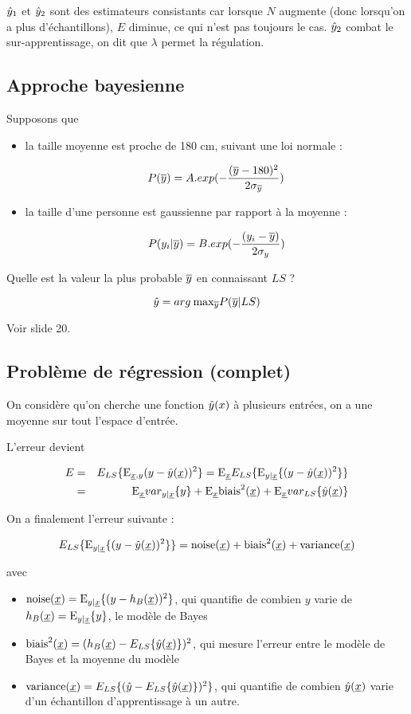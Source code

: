 	$\hat{y}_1$ et $\hat{y}_2$ sont des estimateurs consistants car lorsque $N$ augmente (donc lorsqu'on a plus d'échantillons), $E$ diminue, ce qui n'est pas toujours le cas. $\hat{y}_2$ combat le sur-apprentissage, on dit que $\lambda$ permet la régulation.
	
	
		\subsection{Approche bayesienne}
		
		Supposons que
		
		\begin{itemize}
			\item la taille moyenne est proche de 180 cm, suivant une loi normale :
			
			$$P(\overline{y}) = A.exp(- \frac{(\overline{y} - 180)^2}{2 \sigma_{\overline{y}}})$$
			
			\item la taille d'une personne est gaussienne par rapport à la moyenne :
			
			$$P(y_i \vert \overline{y} ) = B.exp(- \frac{(y_i - \overline{y})}{2 \sigma_y})$$
		\end{itemize}
		
		Quelle est la valeur la plus probable $\overline{y}$ en connaissant $LS$ ?
		
		$$\hat{y} = arg \: \text{max}_{\overline{y}} P(\overline{y} \vert LS)$$
		
		Voir slide 20.
	
		\subsection{Problème de régression (complet)}
	
		On considère qu'on cherche une fonction $\hat{y}(x)$ à plusieurs entrées, on a une moyenne sur tout l'espace d'entrée.
	
		L'erreur devient
	
		\begin{eqnarray*}
		E & = & E_{LS}\{\text{E}_{\underline{x}, y}{(y - \hat{y}(\underline{x}))^2}\} = \text{E}_{\underline{x}}{E_{LS}\{\text{E}_{y \vert \underline{x}} \lbrace (y - \hat{y}(\underline{x}))^2 \rbrace\}} \\
		 & = & \text{E}_{\underline{x}}{var_{y\vert \underline{x}}\{y\}} + \text{E}_{\underline{x}}{\text{biais}^2(\underline{x})} + \text{E}_{\underline{x}}{var_{LS}\{\hat{y}(\underline{x})\}}
		\end{eqnarray*}
	
		On a finalement l'erreur suivante :
	
		$$E_{LS}\{\text{E}_{y \vert \underline{x}} \lbrace (y - \hat{y}(\underline{x}))^2 \rbrace\} = \text{noise}(\underline{x}) + \text{biais}^2(\underline{x}) + \text{variance}(\underline{x})$$
	
		avec
	
		\begin{itemize}
			\item $\text{noise}(\underline{x}) = \text{E}_{y \vert \underline{x}} \lbrace (y - h_B(\underline{x}))^2 \rbrace$, qui quantifie de combien $y$ varie de $h_B(\underline{x}) = \text{E}_{y \vert \underline{x}} \lbrace y \rbrace$, le modèle de Bayes
			\item $\text{biais}^2(\underline{x}) = (h_B(\underline{x}) - E_{LS}\{\hat{y}(\underline{x})\})^2$, qui mesure l'erreur entre le modèle de Bayes et la moyenne du modèle
			\item $\text{variance}(\underline{x}) = E_{LS}\{(\hat{y} - E_{LS}\{\hat{y}(\underline{x})\})^2\}$, qui quantifie de combien $\hat{y}(\underline{x})$ varie d'un échantillon d'apprentissage à un autre.
		\end{itemize}
	
